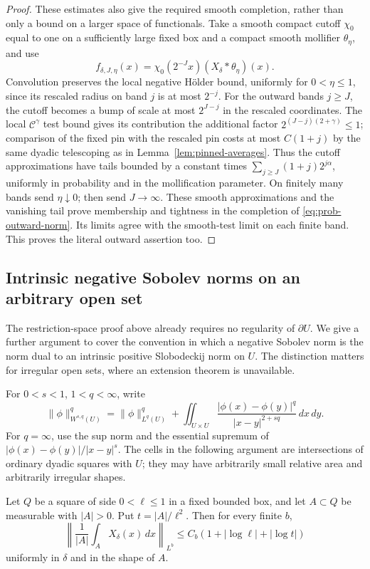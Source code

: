 \begin{proof}
These estimates also give the required smooth completion, rather than
only a bound on a larger space of functionals. Take a smooth compact
cutoff \(\chi_0\) equal to one on a sufficiently large fixed box and a
compact smooth mollifier \(\theta_\eta\), and use
\[
 f_{\delta,J,\eta}(x)
       =\chi_0(2^{-J}x)(X_\delta*\theta_\eta)(x).
\]
Convolution preserves the local negative Hölder bound, uniformly for
\(0<\eta\le1\), since its rescaled radius on band \(j\) is at most
\(2^{-j}\). For the outward bands \(j\ge J\), the cutoff becomes a bump
of scale at most \(2^{J-j}\) in the rescaled coordinates. The local
\(\mathcal C^\gamma\) test bound gives its contribution the additional
factor \(2^{(J-j)(2+\gamma)}\le1\); comparison of the fixed pin with the
rescaled pin costs at most \(C(1+j)\) by the same dyadic telescoping as
in Lemma~\ref{lem:pinned-averages}. Thus the cutoff approximations have
tails bounded by a constant times
\(\sum_{j\ge J}(1+j)2^{j\alpha}\), uniformly in probability and in the
mollification parameter. On finitely many bands send \(\eta\downarrow0\);
then send \(J\to\infty\). These smooth approximations and the vanishing tail prove
membership and tightness in the completion of
\eqref{eq:prob-outward-norm}. Its limits agree with the smooth-test limit
on each finite band. This proves the literal outward assertion too.
\end{proof}

\subsection{Intrinsic negative Sobolev norms on an arbitrary open set}

The restriction-space proof above already requires no regularity of
\(\partial U\). We give a further argument to cover the convention in
which a negative Sobolev norm is the norm dual to an intrinsic positive
Slobodeckij norm on \(U\). The distinction matters for irregular open
sets, where an extension theorem is unavailable.

For \(0<s<1\), \(1<q<\infty\), write
\[
 \|\phi\|_{W^{s,q}(U)}^q
 =\|\phi\|_{L^q(U)}^q+
   \iint_{U\times U}
       \frac{|\phi(x)-\phi(y)|^q}{|x-y|^{2+sq}}\,dx\,dy.
\]
For \(q=\infty\), use the sup norm and the essential supremum of
\(|\phi(x)-\phi(y)|/|x-y|^s\).
The cells in the following argument are intersections of ordinary
dyadic squares with \(U\); they may have arbitrarily small relative
area and arbitrarily irregular shapes.

\begin{lemma}\label{lem:cell-averages}
Let \(Q\) be a square of side \(0<\ell\le1\) in a fixed bounded box,
and let \(A\subset Q\) be measurable with \(|A|>0\). Put
\(t=|A|/\ell^2\). Then for every finite \(b\),
\begin{equation}\label{eq:prob-cell-average}
 \left\|\frac1{|A|}\int_A X_\delta(x)\,dx\right\|_{L^b}
 \le C_b(1+|\log\ell|+|\log t|)
\end{equation}
uniformly in \(\delta\) and in the shape of \(A\).
\end{lemma}

